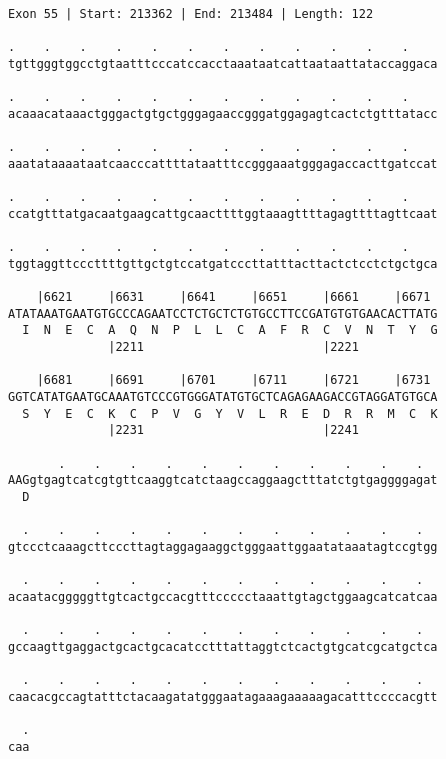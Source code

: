 \documentclass{article}
\begin{document}
\begin{Verbatim}
Exon 55 | Start: 213362 | End: 213484 | Length: 122
 
.    .    .    .    .    .    .    .    .    .    .    .    
tgttgggtggcctgtaatttcccatccacctaaataatcattaataattataccaggaca
  
.    .    .    .    .    .    .    .    .    .    .    .    
acaaacataaactgggactgtgctgggagaaccgggatggagagtcactctgtttatacc
  
.    .    .    .    .    .    .    .    .    .    .    .    
aaatataaaataatcaacccattttataatttccgggaaatgggagaccacttgatccat
  
.    .    .    .    .    .    .    .    .    .    .    .    
ccatgtttatgacaatgaagcattgcaacttttggtaaagttttagagttttagttcaat
  
.    .    .    .    .    .    .    .    .    .    .    .    
tggtaggttcccttttgttgctgtccatgatcccttatttacttactctcctctgctgca
  
    |6621     |6631     |6641     |6651     |6661     |6671 
ATATAAATGAATGTGCCCAGAATCCTCTGCTCTGTGCCTTCCGATGTGTGAACACTTATG
  I  N  E  C  A  Q  N  P  L  L  C  A  F  R  C  V  N  T  Y  G
              |2211                         |2221           
  
    |6681     |6691     |6701     |6711     |6721     |6731 
GGTCATATGAATGCAAATGTCCCGTGGGATATGTGCTCAGAGAAGACCGTAGGATGTGCA
  S  Y  E  C  K  C  P  V  G  Y  V  L  R  E  D  R  R  M  C  K
              |2231                         |2241           
  
       .    .    .    .    .    .    .    .    .    .    .  
AAGgtgagtcatcgtgttcaaggtcatctaagccaggaagctttatctgtgaggggagat
  D                                                         
  
  .    .    .    .    .    .    .    .    .    .    .    .  
gtccctcaaagcttcccttagtaggagaaggctgggaattggaatataaatagtccgtgg
  
  .    .    .    .    .    .    .    .    .    .    .    .  
acaatacgggggttgtcactgccacgtttccccctaaattgtagctggaagcatcatcaa
  
  .    .    .    .    .    .    .    .    .    .    .    .  
gccaagttgaggactgcactgcacatcctttattaggtctcactgtgcatcgcatgctca
  
  .    .    .    .    .    .    .    .    .    .    .    .  
caacacgccagtatttctacaagatatgggaatagaaagaaaaagacatttccccacgtt
  
  .
caa
\end{Verbatim}
\newpage
\end{document}
